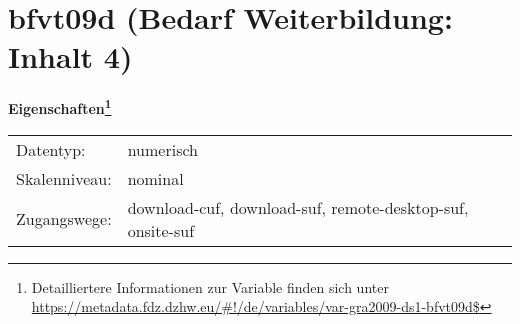 
    \setcounter{footnote}{0}

    \vspace*{-1.8cm}
	\section{bfvt09d (Bedarf Weiterbildung: Inhalt 4)}
	\label{section:bfvt09d}



    \vspace*{0.5cm}
    \noindent\textbf{Eigenschaften\footnote{Detailliertere Informationen zur Variable finden sich unter
		\url{https://metadata.fdz.dzhw.eu/\#!/de/variables/var-gra2009-ds1-bfvt09d$}}}\\
	\begin{tabularx}{\hsize}{@{}lX}
	Datentyp: & numerisch \\
	Skalenniveau: & nominal \\
	Zugangswege: &
	  download-cuf, 
	  download-suf, 
	  remote-desktop-suf, 
	  onsite-suf
 \\
    \end{tabularx}



